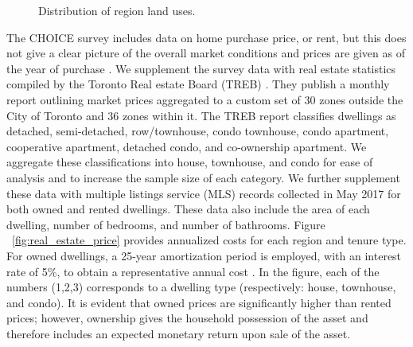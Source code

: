 \begin{figure}[H]
\centering
\caption{\label{fig:area_use}Distribution of region land uses.}
\end{figure}

The CHOICE survey includes data on home purchase price, or rent, but this does not give a clear picture of the overall market conditions and prices are given as of the year of purchase \cite{Papaioannou2014}. We supplement the survey data with real estate statistics compiled by the Toronto Real estate Board (TREB) \cite{TorontoRealEstateBoard2017}. They publish a monthly report outlining market prices aggregated to a custom set of 30 zones outside the City of Toronto and 36 zones within it. The TREB report classifies dwellings as detached, semi-detached, row/townhouse, condo townhouse, condo apartment, cooperative apartment, detached condo, and co-ownership apartment. We aggregate these classifications into house, townhouse, and condo for ease of analysis and to increase the sample size of each category. We further supplement these data with multiple listings service (MLS) records collected in May 2017 for both owned and rented dwellings. These data also include the area of each dwelling, number of bedrooms, and number of bathrooms. Figure ~\ref{fig:real_estate_price} provides annualized costs for each region and tenure type. For owned dwellings, a 25-year amortization period is employed, with an interest rate of 5\%, to obtain a representative annual cost \cite{RBC2018}. In the figure, each of the numbers (1,2,3) corresponds to a dwelling type (respectively: house, townhouse, and condo). It is evident that owned prices are significantly higher than rented prices; however, ownership gives the household possession of the asset and therefore includes an expected monetary return upon sale of the asset.

